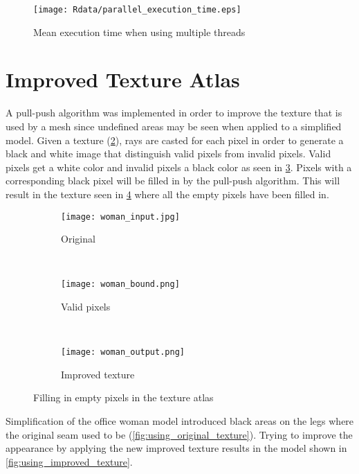 \begin{figure}[ht]
  \centering
  \texttt{[image: Rdata/parallel\_execution\_time.eps]}
  \caption{Mean execution time when using multiple threads}
  \label{fig:execution_time}
\end{figure}

\clearpage

\section{Improved Texture Atlas}
A pull-push algorithm was implemented in order to improve the texture that is used by a mesh since undefined areas may be seen when applied to a simplified model. Given a texture (\cref{fig:original_texture_atlas}), rays are casted for each pixel in order to generate a black and white image that distinguish valid pixels from invalid pixels. Valid pixels get a white color and invalid pixels a black color as seen in \cref{fig:valid_pixels}. Pixels with a corresponding black pixel will be filled in by the pull-push algorithm. This will result in the texture seen in \cref{fig:improved_texture} where all the empty pixels have been filled in.

\begin{figure}[ht]
  \centering
  \begin{subfigure}[b]{.3\textwidth} 
    \texttt{[image: woman\_input.jpg]}
    \caption{Original}
    \label{fig:original_texture_atlas}
  \end{subfigure}
  ~
  \begin{subfigure}[b]{.3\textwidth}
    \texttt{[image: woman\_bound.png]}
    \caption{Valid pixels}
    \label{fig:valid_pixels}
  \end{subfigure}
  ~
  \begin{subfigure}[b]{.3\textwidth}
    \texttt{[image: woman\_output.png]}
    \caption{Improved texture}
    \label{fig:improved_texture}
  \end{subfigure}
  \caption{Filling in empty pixels in the texture atlas}
  \label{fig:improve_texture_atlas}
\end{figure}

Simplification of the office woman model introduced black areas on the legs where the original seam used to be (\cref{fig:using_original_texture}). Trying to improve the appearance by applying the new improved texture results in the model shown in \cref{fig:using_improved_texture}.

